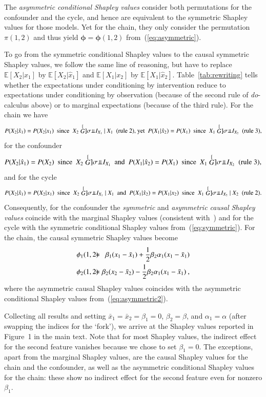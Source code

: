 \documentclass{article}
\newcommand{\expectation}{\mathbb{E}}
\newcommand{\sdo}[1]{\hat{x}_{#1}}
\newcommand{\perm}{\pi}
\newcommand{\bx}{\bar{x}}
\newcommand{\isequal}{\hspace*{-2.5mm} & = & \hspace*{-2.5mm}}
\begin{document}
The {\em asymmetric conditional Shapley values} consider both permutations for the confounder and the cycle, and hence are equivalent to the symmetric Shapley values for those models. Yet for the chain, they only consider the permutation $\perm(1,2)$ and thus yield $\bm{\phi} = \bm{\phi}(1,2)$ from~(\ref{eq:asymmetric}).

To go from the symmetric conditional Shapley values to the causal symmetric Shapley values, we follow the same line of reasoning, but have to replace $\expectation[X_2|x_1]$ by $\expectation[X_2|\sdo{1}]$ and $\expectation[X_1|x_2]$ by $\expectation[X_1|\sdo{2}]$. Table~\ref{tab:rewriting} tells whether
the expectations under conditioning by intervention reduce to expectations under conditioning by observation (because of the second rule of \textit{do}-calculus above) or to marginal expectations (because of the third rule). For the chain we have
\[
P(X_2 | \sdo{1}) = P(X_2 | x_1) \mbox{~~since~~} X_2 \perpsg I_{X_1} ~|~ X_1 \mbox{~~(rule 2),~yet~~} P(X_1 | \sdo{2}) = P(X_1) \mbox{~~since~~} X_1 \perpsg I_{X_2} \mbox{~~(rule 3),}
\]
for the confounder
\[
P(X_2 | \sdo{1}) = P(X_2) \mbox{~~since~~} X_2 \perpsg I_{X_1}  \mbox{~~and~~} P(X_1 | \sdo{2}) = P(X_1) \mbox{~~since~~} X_1 \perpsg I_{X_2} \mbox{~~(rule 3),}
\]
and for the cycle
\[
P(X_2 | \sdo{1}) = P(X_2 | x_1) \mbox{~~since~~} X_2 \perpsg I_{X_1} ~|~ X_1 \mbox{~~and~~} P(X_1 | \sdo{2}) = P(X_1|x_2) \mbox{~~since~~} X_1 \perpsg I_{X_2} ~|~ X_2 \mbox{~~(rule 2).}
\]
Consequently, for the confounder the {\em symmetric} and {\em asymmetric causal Shapley values} coincide with the marginal Shapley values (consistent with~\cite{janzing2019feature}) and for the cycle with the symmetric conditional Shapley values from~(\ref{eq:symmetric}). For the chain, the causal symmetric Shapley values become
\begin{eqnarray}
\phi_1(1,2) \isequal \beta_1 (x_1 - \bx_1) + {1 \over 2} \beta_2 \alpha_1 (x_1 - \bx_1) \nonumber \\
\phi_2(1,2) \isequal \beta_2 (x_2 -\bx_2) - {1 \over 2} \beta_2 \alpha_1 (x_1 - \bx_1) \: ,
\label{eq:asymmetric2}
\end{eqnarray}
where the asymmetric causal Shapley values coincides with the asymmetric conditional Shapley values from~(\ref{eq:asymmetric2}).

Collecting all results and setting $\bx_1 = \bx_2 = \beta_1 = 0$, $\beta_2 = \beta$, and $\alpha_1 = \alpha$ (after swapping the indices for the `fork'), we arrive at the Shapley values reported in Figure~1 in the main text. Note that for most Shapley values, the indirect effect for the second feature vanishes because we chose to set $\beta_1 = 0$. The exceptions, apart from the marginal Shapley values, are the causal Shapley values for the chain and the confounder, as well as the asymmetric conditional Shapley values for the chain: these show no indirect effect for the second feature even for nonzero $\beta_1$.
\end{document}
